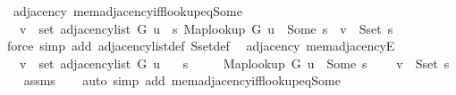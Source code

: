 \begin{isabellebody}
\endisatagproof
{\isafoldproof}%
%
\isadelimproof
\isanewline
%
\endisadelimproof
%
\isadeliminvisible
\isanewline
%
\endisadeliminvisible
%
\isataginvisible
{}\isamarkupfalse%
\ {\isacharparenleft}{\kern0pt}\ adjacency{\isacharparenright}{\kern0pt}\ mem{\isacharunderscore}{\kern0pt}adjacency{\isacharunderscore}{\kern0pt}iff{\isacharunderscore}{\kern0pt}lookup{\isacharunderscore}{\kern0pt}eq{\isacharunderscore}{\kern0pt}Some{\isacharcolon}{\kern0pt}\isanewline
\ \ \ {\isachardoublequoteopen}v\ {\isasymin}\ set\ {\isacharparenleft}{\kern0pt}adjacency{\isacharunderscore}{\kern0pt}list\ G\ u{\isacharparenright}{\kern0pt}\ {\isasymlongleftrightarrow}\ {\isacharparenleft}{\kern0pt}{\isasymexists}s{\isachardot}{\kern0pt}\ Map{\isacharunderscore}{\kern0pt}lookup\ G\ u\ {\isacharequal}{\kern0pt}\ Some\ s\ {\isasymand}\ v\ {\isasymin}\ S{\isachardot}{\kern0pt}set\ s{\isacharparenright}{\kern0pt}{\isachardoublequoteclose}%
\endisataginvisible
{\isafoldinvisible}%
%
\isadeliminvisible
\isanewline
%
\endisadeliminvisible
%
\isadelimproof
\ \ %
\endisadelimproof
%
\isatagproof
{}\isamarkupfalse%
\ {\isacharparenleft}{\kern0pt}force\ simp\ add{\isacharcolon}{\kern0pt}\ adjacency{\isacharunderscore}{\kern0pt}list{\isacharunderscore}{\kern0pt}def\ S{\isachardot}{\kern0pt}set{\isacharunderscore}{\kern0pt}def{\isacharparenright}{\kern0pt}%
\endisatagproof
{\isafoldproof}%
%
\isadelimproof
\isanewline
%
\endisadelimproof
%
\isadeliminvisible
\isanewline
%
\endisadeliminvisible
%
\isataginvisible
{}\isamarkupfalse%
\ {\isacharparenleft}{\kern0pt}\ adjacency{\isacharparenright}{\kern0pt}\ mem{\isacharunderscore}{\kern0pt}adjacencyE{\isacharcolon}{\kern0pt}\isanewline
\ \ \ {\isachardoublequoteopen}v\ {\isasymin}\ set\ {\isacharparenleft}{\kern0pt}adjacency{\isacharunderscore}{\kern0pt}list\ G\ u{\isacharparenright}{\kern0pt}{\isachardoublequoteclose}\isanewline
\ \ \ s\ \isanewline
\ \ \ \ {\isachardoublequoteopen}Map{\isacharunderscore}{\kern0pt}lookup\ G\ u\ {\isacharequal}{\kern0pt}\ Some\ s{\isachardoublequoteclose}\isanewline
\ \ \ \ {\isachardoublequoteopen}v\ {\isasymin}\ S{\isachardot}{\kern0pt}set\ s{\isachardoublequoteclose}%
\endisataginvisible
{\isafoldinvisible}%
%
\isadeliminvisible
\isanewline
%
\endisadeliminvisible
%
\isadelimproof
\ \ %
\endisadelimproof
%
\isatagproof
{}\isamarkupfalse%
\ assms\isanewline
\ \ \isamarkupfalse%
\ {\isacharparenleft}{\kern0pt}auto\ simp\ add{\isacharcolon}{\kern0pt}\ mem{\isacharunderscore}{\kern0pt}adjacency{\isacharunderscore}{\kern0pt}iff{\isacharunderscore}{\kern0pt}lookup{\isacharunderscore}{\kern0pt}eq{\isacharunderscore}{\kern0pt}Some{\isacharparenright}{\kern0pt}%

\end{isabellebody}

